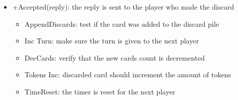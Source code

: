 \begin{description}
\begin{itemize}
\begin{itemize}
		\end{itemize}
		\item +Accepted(reply): the reply is sent to the player who made the discard
		\begin{itemize}
		    \item AppendDiscards: test if the card was added to the discard pile
		    \item Inc Turn: make sure the turn is given to the next player
		    \item DecCards: verify that the new cards count is decremented
		    \item Tokens Inc: discarded card should increment the amount of tokens
		    \item TimeReset: the timer is reset for the next player
		\end{itemize}
		
	\end{itemize}
	
	
\end{description}